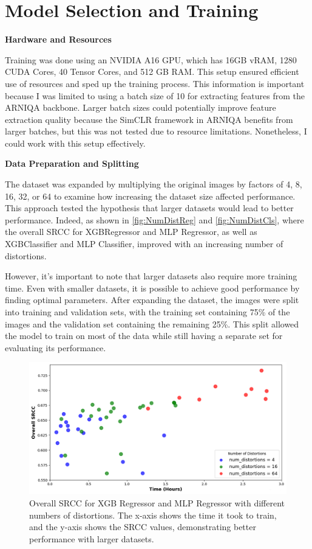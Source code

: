 \section{Model Selection and Training}
\label{sec:ModelTraining}
\textbf{Hardware and Resources} \par
\noindent
Training was done using an NVIDIA A16 GPU, which has 16GB vRAM, 1280 CUDA Cores, 40 Tensor Cores, and 512 GB RAM. This setup ensured efficient use of resources and sped up the training process. This information is important because I was limited to using a batch size of 10 for extracting features from the ARNIQA backbone. Larger batch sizes could potentially improve feature extraction quality because the SimCLR framework in ARNIQA benefits from larger batches, but this was not tested due to resource limitations. Nonetheless, I could work with this setup effectively.  \par
\vspace{\baselineskip}
\noindent
\textbf{Data Preparation and Splitting} \par
\noindent
The dataset was expanded by multiplying the original images by factors of 4, 8, 16, 32, or 64 to examine how increasing the dataset size affected performance. This approach tested the hypothesis that larger datasets would lead to better performance. Indeed, as shown in \autoref{fig:NumDistReg} and \autoref{fig:NumDistCls}, where the overall SRCC for XGBRegressor and MLP Regressor, as well as XGBClassifier and MLP Classifier, improved with an increasing number of distortions. \par
\vspace{\baselineskip}
\noindent
However, it's important to note that larger datasets also require more training time. Even with smaller datasets, it is possible to achieve good performance by finding optimal parameters.  After expanding the dataset, the images were split into training and validation sets, with the training set containing 75\% of the images and the validation set containing the remaining 25\%. This split allowed the model to train on most of the data while still having a separate set for evaluating its performance. \par
\begin{figure}[ht]
    \centering
    \includegraphics[keepaspectratio,width=15cm]{img/num_dist_reg.png}
    \caption{Overall SRCC for XGB Regressor and MLP Regressor with different numbers of distortions. The x-axis shows the time it took to train, and the y-axis shows the SRCC values, demonstrating better performance with larger datasets.}
    \label{fig:NumDistReg}
\end{figure}

